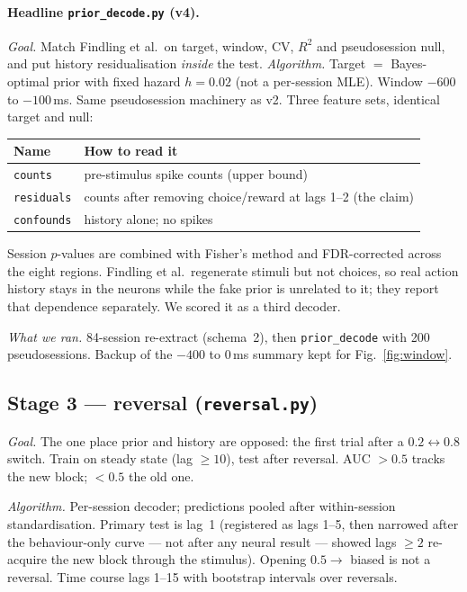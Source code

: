 \documentclass[11pt,a4paper]{article}
\begin{document}
\paragraph{Headline \texttt{prior\_decode.py} (v4).}
\textit{Goal.} Match Findling et al.\ on target, window, CV, $R^2$ and
pseudosession null, and put history residualisation \emph{inside} the test.
\textit{Algorithm.} Target $=$ Bayes-optimal prior with fixed hazard
$h=0.02$ (not a per-session MLE). Window $-600$ to $-100$\,ms. Same
pseudosession machinery as v2. Three feature sets, identical target and
null:
\begin{center}
\small
\begin{tabular}{@{}ll@{}}
\toprule
Name & How to read it \\
\midrule
\texttt{counts} & pre-stimulus spike counts (upper bound) \\
\texttt{residuals} & counts after removing choice/reward at lags 1--2
  (the claim) \\
\texttt{confounds} & history alone; no spikes \\
\bottomrule
\end{tabular}
\end{center}
Session $p$-values are combined with Fisher's method and FDR-corrected
across the eight regions. Findling et al.\ regenerate stimuli but not
choices, so real action history stays in the neurons while the fake prior is
unrelated to it; they report that dependence separately. We scored it as a
third decoder.

\textit{What we ran.} 84-session re-extract (schema~2), then
\texttt{prior\_decode} with 200 pseudosessions. Backup of the $-400$ to
$0$\,ms summary kept for Fig.~\ref{fig:window}.

\subsection{Stage 3 --- reversal (\texttt{reversal.py})}

\textit{Goal.} The one place prior and history are opposed: the first trial
after a $0.2\leftrightarrow 0.8$ switch. Train on steady state (lag $\ge 10$),
test after reversal. AUC $>0.5$ tracks the new block; $<0.5$ the old one.

\textit{Algorithm.} Per-session decoder; predictions pooled after
within-session standardisation. Primary test is lag~1 (registered as lags
1--5, then narrowed after the behaviour-only curve --- not after any neural
result --- showed lags $\ge 2$ re-acquire the new block through the stimulus).
Opening $0.5\to$ biased is not a reversal. Time course lags 1--15 with
bootstrap intervals over reversals.
\end{document}
